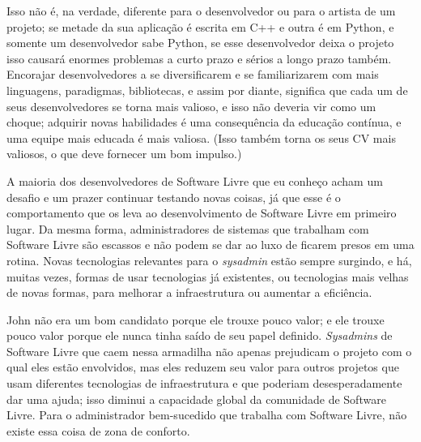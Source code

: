 Isso não é, na verdade, diferente para o desenvolvedor ou para o artista
de um projeto; se metade da sua aplicação é escrita em C++ e outra é em
Python, e somente um desenvolvedor sabe Python, se esse desenvolvedor
deixa o projeto isso causará enormes problemas a curto prazo e sérios
a longo prazo também. Encorajar desenvolvedores a se diversificarem e
se familiarizarem com mais linguagens, paradigmas, bibliotecas, e assim
por diante, significa que cada um de seus desenvolvedores se torna mais
valioso, e isso não deveria vir como um choque; adquirir novas habilidades
é uma consequência da educação contínua, e uma equipe mais educada é mais
valiosa. (Isso também torna os seus CV mais valiosos, o que deve fornecer
um bom impulso.)

A maioria dos desenvolvedores de Software Livre que eu conheço acham um
desafio e um prazer continuar testando novas coisas, já que esse é o
comportamento que os leva ao desenvolvimento de Software Livre em primeiro
lugar. Da mesma forma, administradores de sistemas que trabalham
com Software Livre são escassos e não podem se dar ao luxo de ficarem
presos em uma rotina. Novas tecnologias relevantes para o \textit{sysadmin}
estão sempre surgindo, e há, muitas vezes, formas de usar tecnologias
já existentes, ou tecnologias mais velhas de novas formas, para melhorar
a infraestrutura ou aumentar a eficiência.

John não era um bom candidato porque ele trouxe pouco valor; e ele trouxe
pouco valor porque ele nunca tinha saído de seu papel definido. \textit{Sysadmins}
de Software Livre que caem nessa armadilha não apenas prejudicam o projeto
com o qual eles estão envolvidos, mas eles reduzem seu valor para outros projetos
que usam diferentes tecnologias de infraestrutura e que poderiam desesperadamente
dar uma ajuda; isso diminui a capacidade global da comunidade de Software Livre.
Para o administrador bem-sucedido que trabalha com Software Livre, não existe
essa coisa de zona de conforto.
